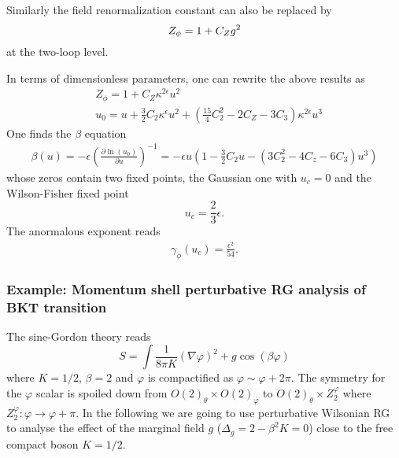 \documentclass[submission, PhysLectNotes]{SciPost}
\begin{document}
Similarly the field renormalization constant can also be replaced by
\begin{equation}
	Z_\phi = 1 + C_Z g^2 \\
\end{equation}
at the two-loop level.

In terms of dimensionless parameters, one can rewrite the above results as
\begin{equation}
	\begin{aligned}
		&Z_\phi = 1 + C_Z \kappa^{2 \epsilon} u^2 \\
		&u_0 = u + \frac{3}{2} C_2 \kappa^{\epsilon} u^2 + \left(\frac{15}{4} C_2^2 - 2 C_Z - 3 C_3\right) \kappa^{2\epsilon} u^3
	\end{aligned}
\end{equation}
One finds the $\beta$ equation
\begin{equation}
	\begin{aligned}
		\beta(u) = -\epsilon\left(\frac{\partial \ln(u_0)}{\partial u}\right)^{-1} = -\epsilon u \left( 1 - \frac{3}{2} C_2 u - \left(3C_2^2-4C_z-6C_3\right)u^3 \right)
	\end{aligned}
\end{equation}
whose zeros contain two fixed points, the Gaussian one with $u_c = 0$ and the Wilson-Fisher fixed point
\begin{equation}
	u_c = \frac{2}{3}\epsilon.
\end{equation}
The anormalous exponent reads 
\begin{equation}
	\begin{aligned}
		\gamma_\phi(u_c) = \frac{\epsilon^2}{54}. 
	\end{aligned}
\end{equation}


\subsubsection*{Example: Momentum shell perturbative RG analysis of BKT transition}
The sine-Gordon theory reads
\begin{equation}
S = \int \frac{1}{8 \pi  K}(\nabla \varphi )^2 + g \cos( \beta \varphi)
\end{equation}
where $K=1/2$, $\beta=2$ and $\varphi$ is compactified as $\varphi \sim \varphi + 2\pi$. The symmetry for the $\varphi$ scalar is spoiled down from $O(2)_\theta \times O(2)_\varphi$ to $O(2)_\theta \times Z_2^\varphi$ where $Z_2^\varphi : \varphi \rightarrow \varphi + \pi$. In the following we are going to use perturbative Wilsonian RG to analyse the effect of the marginal field $g$ ($\Delta_g =2 - \beta^2K = 0$) close to the free compact boson $K=1/2$.
\end{document}
